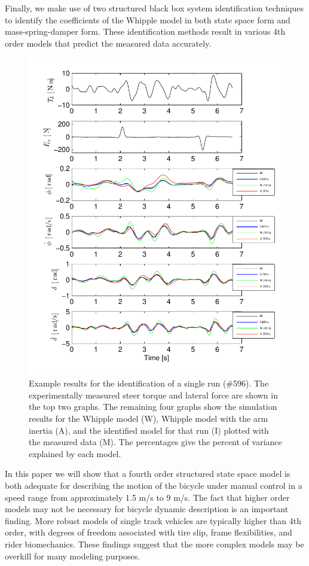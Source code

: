 \documentclass{article}
\begin{document}
Finally, we make use of two structured black box system identification
techniques to identify the coefficients of the Whipple model in both state
space form and mass-spring-damper form. These identification methods result in
various 4th order models that predict the measured data accurately.

\begin{figure}
  \centering
  \includegraphics[width=5.0in]{example-fit.pdf}
  \caption{Example results for the identification of a single run (\#596). The
  experimentally measured steer torque and lateral force are shown in the top
  two graphs. The remaining four graphs show the simulation results for the
  Whipple model (W), Whipple model with the arm inertia (A), and the identified
  model for that run (I) plotted with the measured data (M). The percentages
  give the percent of variance explained by each model.}
\end{figure}

In this paper we will show that a fourth order structured state space model is
both adequate for describing the motion of the bicycle under manual control in
a speed range from approximately 1.5 m/s to 9 m/s. The fact that higher order
models may not be necessary for bicycle dynamic description is an important
finding. More robust models of single track vehicles are typically higher than
4th order, with degrees of freedom associated with tire slip, frame
flexibilities, and rider biomechanics. These findings suggest that the more
complex models may be overkill for many modeling purposes.
\end{document}
